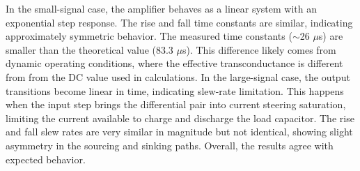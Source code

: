 \documentclass[9pt,a4paper,column,twoside]{tau-class/tau}
\begin{document}
    In the small-signal case, the amplifier behaves as a linear system with an exponential step response. 
    The rise and fall time constants are similar, indicating approximately symmetric behavior.
    The measured time constants ($\sim$26 $\mu$s) are smaller 
    than the theoretical value (83.3 $\mu$s). 
    This difference likely comes from dynamic operating conditions, 
    where the effective transconductance is different from from the DC value used in calculations.
    In the large-signal case, the output transitions 
    become linear in time, indicating slew-rate limitation. This happens when the input step brings
    the differential pair into current steering saturation, 
    limiting the current available to charge and discharge the load capacitor.
    The rise and fall slew rates are very similar in magnitude 
    but not identical, showing slight asymmetry in the sourcing and sinking paths. 
    Overall, the results agree with expected behavior.
\end{document}
